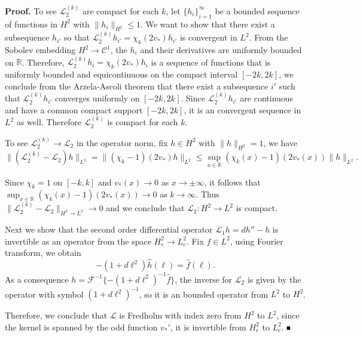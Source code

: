 \documentclass[letterpaper,11pt]{article}
\newcommand{\R}{\mathbb{R}}
\newcommand{\cL}{\mathcal{L}}
\numberwithin{equation}{section}
\theoremstyle{plain}
\theoremstyle{remark}
\newenvironment{Proof}[1][.]%
 {\begin{trivlist}\item[]\textbf{Proof#1 }}%
 {\hspace*{\fill}$\rule{0.3\baselineskip}{0.35\baselineskip}$\end{trivlist}}
\begin{document}
\begin{Proof}
To see $\cL_2^{(k)}$ are compact for each $k$, let $\{h_i\}_{i=1}^{\infty}$ be a bounded sequence of functions in $H^2$ with $\|h_i\|_{H^2} \le 1$. We want to show that there exist a subsequence $h_{i'}$ so that $\cL_2^{(k)} h_{i'} = \chi_k (2v_*)h_{i'}$ is convergent in $L^2$. From the Sobolev embedding $H^2 \to \mathscr{C}^1$, the $h_i$ and their derivatives are uniformly bounded on $\R$. Therefore, $\cL_2^{(k)}h_i = \chi_k(2v_*)h_i$ is a sequence of functions that is uniformly bounded and equicontinuous on the compact interval $[-2k,2k]$, we conclude from the Arzela-Ascoli theorem that there exist a subsequence $i'$ such that $\cL_2^{(k)}h_{i'}$ converges uniformly on $[-2k,2k]$. Since $\cL_2^{(k)}h_{i'}$ are continuous and have a common compact support $[-2k,2k]$, it is an convergent sequence in $L^2$ as well. Therefore $\cL_2^{(k)}$ is compact for each $k$.

To see $\cL_2^{(k)} \to \cL_2$ in the operator norm, fix $h \in H^2$ with $\|h\|_{H^2} =1$, we have
\[
\|(\cL_2^{(k)}-\cL_2)h\|_{L^2} = \|(\chi_k-1)(2v_*)h\|_{L^2}\le  \sup_{x\in \R}(\chi_k(x)-1)(2v_*(x)) \|h\|_{L^2}.
\]

Since $\chi_k = 1$ on $[-k,k]$ and $v_*(x) \to 0$ as $x\to \pm \infty$, it follows that $\displaystyle \sup_{x\in \R}(\chi_k(x)-1)(2v_*(x)) \to 0$ as $k \to \infty$. Thus $\|\cL_2^{(k)} - \cL_2\|_{H^2 \to L^2} \to 0$ and we conclude that $\cL_2:H^2 \to L^2$ is compact.


Next we show that the second order differential operator $\cL_1 h = dh'' - h$ is invertible as an operator from the space $H^2_{e} \to L^{2}_{e}$. Fix $f \in L^2$, using Fourier transform, we obtain
\[
-(1+d\ell^2)\widehat{h}(\ell) = \widehat{f}(\ell).
\]
As a consequence $h = \mathcal{F}^{-1} \{-(1+d\ell^2)^{-1}\widehat{f}\}$, the inverse for $\cL_2$ is given by the operator with symbol $(1+d\ell^2)^{-1}$, so it is an bounded operator from $L^2$ to $H^2$.

Therefore, we conclude that $\cL$ is Fredholm with index zero from $H^2$ to $L^{2}$, since the kernel is spanned by the odd function $v_*'$, it is invertible from $H^2_{e}$ to $L^{2}_{e}$.
\end{Proof}


\end{document}
